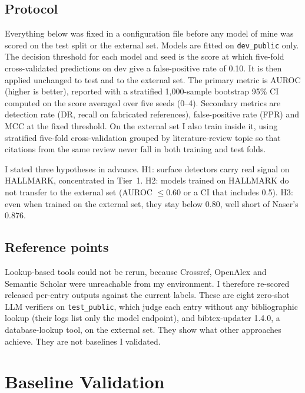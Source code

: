 \documentclass[acmsmall,nonacm]{acmart}
\begin{document}
\subsection{Protocol}
Everything below was fixed in a configuration file before any model of mine was scored on the test split or the external set. Models are fitted on \texttt{dev\_public} only. The decision threshold for each model and seed is the score at which five-fold cross-validated predictions on dev give a false-positive rate of 0.10. It is then applied unchanged to test and to the external set. The primary metric is AUROC (higher is better), reported with a stratified 1,000-sample bootstrap 95\% CI computed on the score averaged over five seeds (0--4). Secondary metrics are detection rate (DR, recall on fabricated references), false-positive rate (FPR) and MCC at the fixed threshold. On the external set I also train inside it, using stratified five-fold cross-validation grouped by literature-review topic so that citations from the same review never fall in both training and test folds.

I stated three hypotheses in advance. H1: surface detectors carry real signal on HALLMARK, concentrated in Tier~1. H2: models trained on HALLMARK do not transfer to the external set (AUROC $\le 0.60$ or a CI that includes 0.5). H3: even when trained on the external set, they stay below 0.80, well short of Naser's 0.876.

\subsection{Reference points}
Lookup-based tools could not be rerun, because Crossref, OpenAlex and Semantic Scholar were unreachable from my environment. I therefore re-scored released per-entry outputs against the current labels. These are eight zero-shot LLM verifiers on \texttt{test\_public}, which judge each entry without any bibliographic lookup (their logs list only the model endpoint), and bibtex-updater 1.4.0, a database-lookup tool, on the external set. They show what other approaches achieve. They are not baselines I validated.

\section{Baseline Validation}
\end{document}
